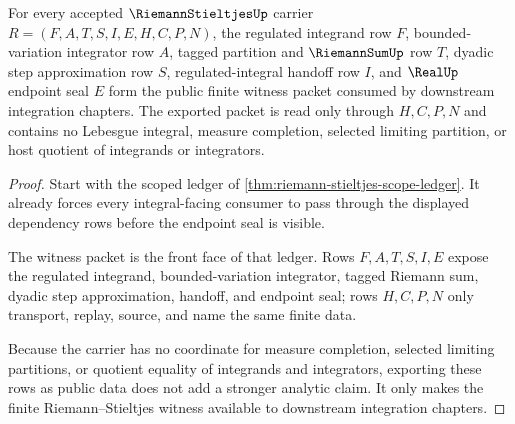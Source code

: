 \begin{theorem}
\label{thm:riemann-stieltjes-public-witness-export}
For every accepted $\RiemannStieltjesUp$ carrier $R=(F,A,T,S,I,E,H,C,P,N)$, the regulated integrand row $F$, bounded-variation integrator row $A$, tagged partition and $\RiemannSumUp$ row $T$, dyadic step approximation row $S$, regulated-integral handoff row $I$, and $\RealUp$ endpoint seal $E$ form the public finite witness packet consumed by downstream integration chapters. The exported packet is read only through $H,C,P,N$ and contains no Lebesgue integral, measure completion, selected limiting partition, or host quotient of integrands or integrators.
\end{theorem}
\begin{proof}
Start with the scoped ledger of \autoref{thm:riemann-stieltjes-scope-ledger}. It already forces every integral-facing consumer to pass through the displayed dependency rows before the endpoint seal is visible.

The witness packet is the front face of that ledger. Rows $F,A,T,S,I,E$ expose the regulated integrand, bounded-variation integrator, tagged Riemann sum, dyadic step approximation, handoff, and endpoint seal; rows $H,C,P,N$ only transport, replay, source, and name the same finite data.

Because the carrier has no coordinate for measure completion, selected limiting partitions, or quotient equality of integrands and integrators, exporting these rows as public data does not add a stronger analytic claim. It only makes the finite Riemann--Stieltjes witness available to downstream integration chapters.
\end{proof}


